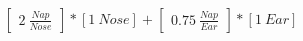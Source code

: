 \documentclass[preview]{standalone}
\begin{document}
\begin{align*}
\begin{bmatrix} 2 \ \frac{Nap}{Nose} \end{bmatrix} *  [1 \ Nose]  + \begin{bmatrix} 0.75 \ \frac{Nap}{Ear} \end{bmatrix} *  [1 \ Ear]
\end{align*}
\end{document}
